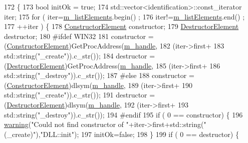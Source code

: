\begin{DoxyCode}
172                         \{
173   \textcolor{keywordtype}{bool} initOk = \textcolor{keyword}{true};
174   std::vector<identification>::const\_iterator iter;
175   \textcolor{keywordflow}{for} ( iter=\hyperlink{classDLL_a2e88d7167245fd7b6a000817583643ed}{m\_listElements}.begin() ;
176         iter!=\hyperlink{classDLL_a2e88d7167245fd7b6a000817583643ed}{m\_listElements}.end() ;
177         ++iter ) \{
178     \hyperlink{classDLL_a104a81e667f9a54504c0faf095f77fc7}{ConstructorElement} constructor;
179     \hyperlink{classDLL_a204f0c776712969410a2673db3d98cf5}{DestructorElement} destructor;
180 \textcolor{preprocessor}{#ifdef WIN32
}
181     constructor = (\hyperlink{classDLL_a104a81e667f9a54504c0faf095f77fc7}{ConstructorElement})GetProcAddress(\hyperlink{classDLL_a2ca22015aef35c5d61f8daaf3c070154}{m\_handle},
182                                                      (iter->first+
183                                                       std::string(\textcolor{stringliteral}{"\_create"})).c\_str());
184     destructor = (\hyperlink{classDLL_a204f0c776712969410a2673db3d98cf5}{DestructorElement})GetProcAddress(\hyperlink{classDLL_a2ca22015aef35c5d61f8daaf3c070154}{m\_handle},
185                                                    (iter->first+
186                                                     std::string(\textcolor{stringliteral}{"\_destroy"})).c\_str());
187 \textcolor{preprocessor}{#else
}
188     constructor = (\hyperlink{classDLL_a104a81e667f9a54504c0faf095f77fc7}{ConstructorElement})dlsym(\hyperlink{classDLL_a2ca22015aef35c5d61f8daaf3c070154}{m\_handle},
189                                            (iter->first+
190                                            std::string(\textcolor{stringliteral}{"\_create"})).c\_str());
191     destructor = (\hyperlink{classDLL_a204f0c776712969410a2673db3d98cf5}{DestructorElement})dlsym(\hyperlink{classDLL_a2ca22015aef35c5d61f8daaf3c070154}{m\_handle},
192                                          (iter->first+
193                                          std::string(\textcolor{stringliteral}{"\_destroy"})).c\_str());
194 \textcolor{preprocessor}{#endif
}
195     \textcolor{keywordflow}{if} ( 0 == constructor) \{
196       \hyperlink{classDLL_a4bbc341bad623eedb5c228c91ce2e858}{warning}(\textcolor{stringliteral}{"Could not find constructor of "}+iter->first+std::string(\textcolor{stringliteral}{" (\_create)"}),\textcolor{stringliteral}{"DLL::init"});
197       initOk=\textcolor{keyword}{false};
198     \}
199     \textcolor{keywordflow}{if} ( 0 == destructor) \{

\end{DoxyCode}
